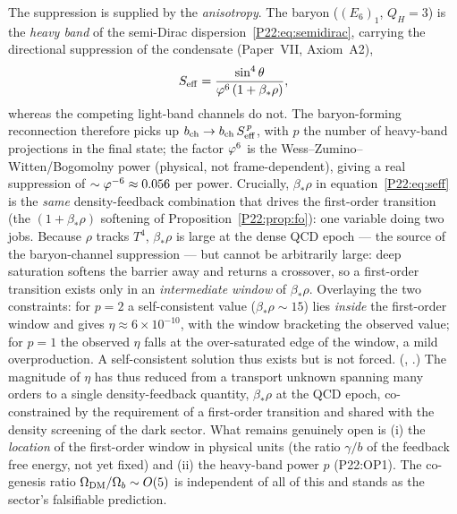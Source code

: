The suppression is supplied by the \emph{anisotropy}. The baryon
($(E_6)_1$, $Q_H{=}3$) is the \emph{heavy band} of the semi-Dirac
dispersion~\eqref{P22:eq:semidirac}, carrying the directional
suppression of the condensate (Paper~VII, Axiom~A2),
\begin{equation}
  S_{\rm eff}=\frac{\sin^4\theta}{\varphi^6\,(1+\beta_*\rho)},
  \label{P22:eq:seff}
\end{equation}
whereas the competing light-band channels do not. The baryon-forming
reconnection therefore picks up $b_{\rm ch}\to b_{\rm ch}\,S_{\rm eff}^{\,p}$,
with $p$ the number of heavy-band projections in the final state; the
factor $\varphi^6$ is the Wess--Zumino--Witten/Bogomolny power (physical,
not frame-dependent), giving a real suppression of
$\sim\varphi^{-6}\approx0.056$ per power. Crucially, $\beta_*\rho$ in
equation~\eqref{P22:eq:seff} is the \emph{same} density-feedback
combination that drives the first-order transition (the
$(1+\beta_*\rho)$ softening of Proposition~\ref{P22:prop:fo}): one
variable doing two jobs. Because $\rho$ tracks $T^4$, $\beta_*\rho$ is
large at the dense QCD epoch --- the source of the baryon-channel
suppression --- but cannot be arbitrarily large: deep saturation
softens the barrier away and returns a crossover, so a first-order
transition exists only in an \emph{intermediate window} of
$\beta_*\rho$. Overlaying the two constraints: for $p=2$ a
self-consistent value ($\beta_*\rho\sim15$) lies \emph{inside} the
first-order window and gives $\eta\approx6\times10^{-10}$, with the
window bracketing the observed value; for $p=1$ the observed $\eta$
falls at the over-saturated edge of the window, a mild overproduction.
A self-consistent solution thus exists but is not forced.
(,
.) The magnitude of $\eta$ has
thus reduced from a transport unknown spanning many orders to a single
density-feedback quantity, $\beta_*\rho$ at the QCD epoch, co-constrained
by the requirement of a first-order transition and shared with the
density screening of the dark sector. What remains genuinely open is
(i) the \emph{location} of the first-order window in physical units
(the ratio $\gamma/b$ of the feedback free energy, not yet fixed) and
(ii) the heavy-band power $p$ (P22:OP1). The co-genesis ratio
$\Omega_{\mathrm{DM}}/\Omega_{b}\sim O(5)$ is independent of all of this and stands as the
sector's falsifiable prediction.
